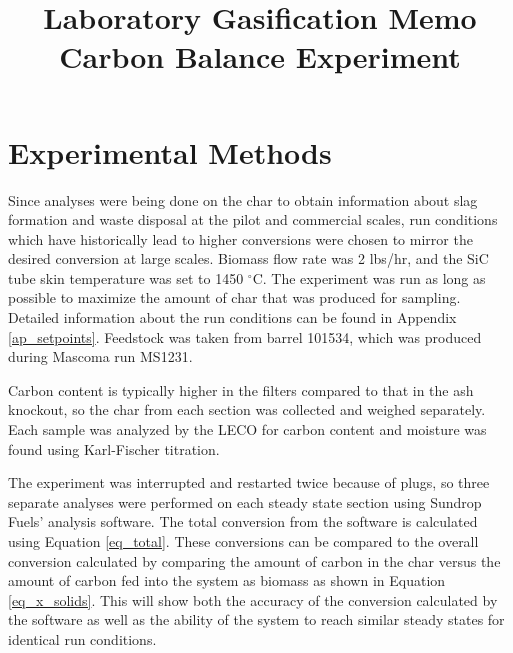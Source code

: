 \documentclass[11pt,twocolumn]{article}
\date{}
\title{Laboratory Gasification Memo\\Carbon Balance Experiment \vspace{-6ex}}
\begin{document}

\section*{Experimental Methods}

Since analyses were being done on the char to obtain information about slag formation and waste disposal at the pilot and commercial scales, run conditions which have historically lead to higher conversions were chosen to mirror the desired conversion at large scales.  Biomass flow rate was 2 lbs/hr, and the SiC tube skin temperature was set to 1450 $^\circ$C.  The experiment was run as long as possible to maximize the amount of char that was produced for sampling.  Detailed information about the run conditions can be found in Appendix \ref{ap_setpoints}.  Feedstock was taken from barrel 101534, which was produced during Mascoma run MS1231.

Carbon content is typically higher in the filters compared to that in the ash knockout, so the char from each section was collected and weighed separately.  Each sample was analyzed by the LECO for carbon content and moisture was found using Karl-Fischer titration.

The experiment was interrupted and restarted twice because of plugs, so three separate analyses were performed on each steady state section using Sundrop Fuels' analysis software.  The total conversion from the software is calculated using Equation \ref{eq_total}.  These conversions can be compared to the overall conversion calculated by comparing the amount of carbon in the char versus the amount of carbon fed into the system as biomass as shown in Equation \ref{eq_x_solids}.  This will show both the accuracy of the conversion calculated by the software as well as the ability of the system to reach similar steady states for identical run conditions.
\end{document}
